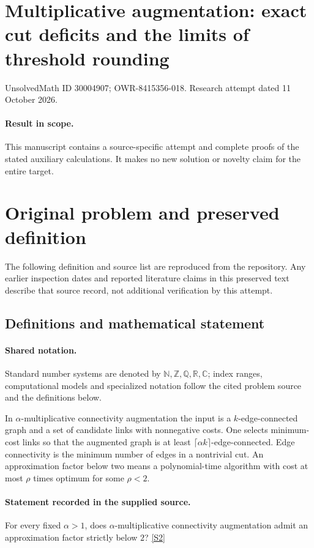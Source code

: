 \documentclass[11pt]{article}
\begin{document}
\section*{Multiplicative augmentation: exact cut deficits and the limits of threshold rounding}
\noindent UnsolvedMath ID 30004907; OWR-8415356-018. Research attempt dated 11 October 2026.
\paragraph{Result in scope.}This manuscript contains a source-specific attempt and complete proofs of the stated auxiliary calculations. It makes no new solution or novelty claim for the entire target.
\section{Original problem and preserved definition}
The following definition and source list are reproduced from the repository. Any earlier inspection dates and reported literature claims in this preserved text describe that source record, not additional verification by this attempt.
\subsection{Definitions and mathematical statement}

\paragraph{Shared notation.}Standard number systems are denoted by $\mathbb N,\mathbb Z,\mathbb Q,\mathbb R,\mathbb C$; index ranges, computational models and specialized notation follow the cited problem source and the definitions below.


In $\alpha$-multiplicative connectivity augmentation the input is a $k$-edge-connected graph and a set of candidate links with nonnegative costs. One selects minimum-cost links so that the augmented graph is at least $\lceil\alpha k\rceil$-edge-connected. Edge connectivity is the minimum number of edges in a nontrivial cut. An approximation factor below two means a polynomial-time algorithm with cost at most $\rho$ times optimum for some $\rho<2$.
\paragraph{Statement recorded in the supplied source.}
For every fixed $\alpha>1$, does $\alpha$-multiplicative connectivity augmentation admit an approximation factor strictly below $2$? \href{https://doi.org/10.4171/owr/2021/53}{[S2]}
\end{document}
